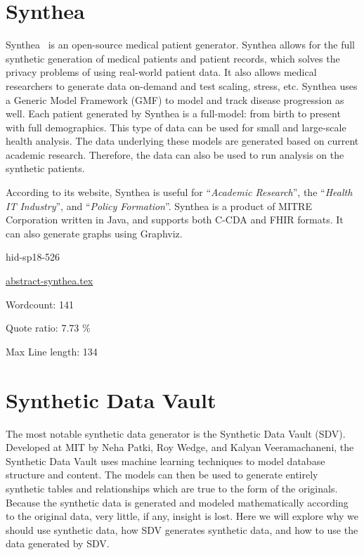 \section{Synthea}

Synthea~\cite{hid-sp18-526-www-synthea} is an open-source medical patient
generator. Synthea allows for the full synthetic generation of medical patients
and patient records, which solves the privacy problems of using real-world
patient data. It also allows medical researchers to generate data on-demand
and test scaling, stress, etc. Synthea uses a Generic Model Framework (GMF) to
model and track disease progression as well. Each patient generated by Synthea
is a full-model: from birth to present with full demographics. This type of
data can be used for small and large-scale health analysis. The data underlying
these models are generated based on current academic research. Therefore,
the data can also be used to run analysis on the synthetic patients.

According to its website, Synthea is useful for \color{blue}``\emph{Academic Research}''\color{black}, the
\color{blue}``\emph{Health IT Industry}''\color{black}, and \color{blue}``\emph{Policy Formation}''\color{black}. Synthea is a product
of MITRE Corporation written in Java, and supports both C-CDA and FHIR
formats. It can also generate graphs using Graphviz.



\begin{IU}

hid-sp18-526

\href{https://github.com/cloudmesh-community/hid-sp18-526/blob/master//technology/abstract-synthea.tex}{abstract-synthea.tex}

 

Wordcount: 141


Quote ratio: 7.73 \%
 
Max Line length: 134
\end{IU}

\section{Synthetic Data Vault}

The most notable synthetic data generator is the Synthetic Data Vault
(SDV)\cite{hid-sp18-526-patki-sdv}. Developed at MIT by Neha Patki, 
Roy Wedge, and Kalyan Veeramachaneni, the Synthetic Data Vault uses 
machine learning techniques to model database structure and content. 
The models can then be used to generate entirely synthetic tables 
and relationships which are true to the form of the originals. 
Because the synthetic data is generated and modeled mathematically
according to the original data, very little, if any, insight is lost. Here
we will explore why we should use synthetic data, how SDV generates synthetic
data, and how to use the data generated by SDV.

